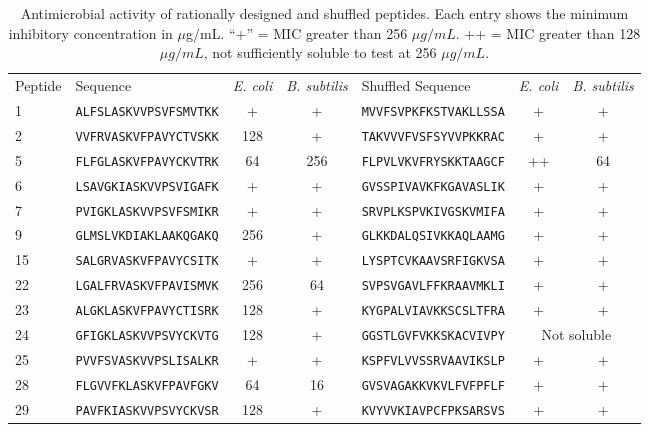 \begin{table}[ptbh]
    \caption[Antimicrobial activity of rationally designed and shuffled peptides]{Antimicrobial activity of rationally designed and shuffled peptides.
    Each entry shows the minimum inhibitory concentration in $\mu$g/mL\@.  ``+'' = MIC greater than 256 $\mu g/mL$.  ++ = MIC greater than 128 $\mu g/mL$, not sufficiently soluble to test at 256 $\mu g/mL$.}\label{table:chrisResults1}
                \centering \scriptsize
        \begin{tabular}{llcclcc} \hline\hline
Peptide  &  Sequence  &  \emph{E. coli}  &  \emph{B. subtilis}  &  Shuffled Sequence  &  \emph{E. coli}  &  \emph{B. subtilis} \\
\rowcolor[gray]{0.9}
1  &  \texttt{ALFSLASKVVPSVFSMVTKK}  &  +  &  +  & \texttt{MVVFSVPKFKSTVAKLLSSA}  &  +  &  + \\
2  &  \texttt{VVFRVASKVFPAVYCTVSKK}  &  128  &  +  & \texttt{TAKVVVFVSFSYVVPKKRAC}  &  +  &  + \\
\rowcolor[gray]{0.9}
5  &  \texttt{FLFGLASKVFPAVYCKVTRK}  &  64  &  256  & \texttt{FLPVLVKVFRYSKKTAAGCF}  &  ++  &  64 \\
6  &  \texttt{LSAVGKIASKVVPSVIGAFK}  &  +  &  +  & \texttt{GVSSPIVAVKFKGAVASLIK}  &  +  &  + \\
\rowcolor[gray]{0.9}
7  &  \texttt{PVIGKLASKVVPSVFSMIKR}  &  +  &  +  & \texttt{SRVPLKSPVKIVGSKVMIFA}  &  +  &  + \\
9  &  \texttt{GLMSLVKDIAKLAAKQGAKQ}  &  256  &  +  & \texttt{GLKKDALQSIVKKAQLAAMG}  &  +  &  + \\
\rowcolor[gray]{0.9}
15  &  \texttt{SALGRVASKVFPAVYCSITK}  &  +  &  +  & \texttt{LYSPTCVKAAVSRFIGKVSA}  &  +  &  + \\
22  &  \texttt{LGALFRVASKVFPAVISMVK}  &  256  &  64  & \texttt{SVPSVGAVLFFKRAAVMKLI}  &  +  &  + \\
\rowcolor[gray]{0.9}
23  &  \texttt{ALGKLASKVFPAVYCTISRK}  &  128  &  +  & \texttt{KYGPALVIAVKKSCSLTFRA}  &  +  &  + \\
24  &  \texttt{GFIGKLASKVVPSVYCKVTG}  &  128  &  +  & \texttt{GGSTLGVFVKKSKACVIVPY}  &  \multicolumn{2}{c}{Not  soluble}     \\
\rowcolor[gray]{0.9}
25  &  \texttt{PVVFSVASKVVPSLISALKR}  &  +  &  +  & \texttt{KSPFVLVVSSRVAAVIKSLP}  &  +  &  + \\
28  &  \texttt{FLGVVFKLASKVFPAVFGKV}  &  64  &  16  & \texttt{GVSVAGAKKVKVLFVFPFLF}  &  +  &  + \\
\rowcolor[gray]{0.9}
29  &  \texttt{PAVFKIASKVVPSVYCKVSR}  &  128  &  +  & \texttt{KVYVVKIAVPCFPKSARSVS}  &  +  &  + \\

\end{tabular}
\end{table}
